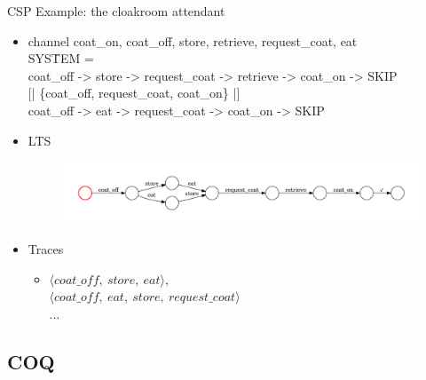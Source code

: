 \documentclass[t]{beamer}
\begin{document}
\begin{frame}{CSP}
	Example: the cloakroom attendant
	\begin{itemize}
		\item \CSPM{}
		\ttfamily
		\scriptsize
		\begin{tabbing}
			channel coat\_on, coat\_off, store, retrieve, request\_coat, eat\\
			SYS\=TEM =\\
			\>	coat\_off -> store -> request\_coat -> retrieve -> coat\_on -> SKIP\\
			\>	{[| \{coat\_off, request\_coat, coat\_on\} |]}\\
			\>	coat\_off -> eat -> request\_coat -> coat\_on -> SKIP
		\end{tabbing}
		\normalfont
		\normalsize

		\item LTS
		\begin{figure}
			\includegraphics[scale=0.3]{figures/LTS.pdf}
		\end{figure}

		\item Traces
		\begin{itemize}
			\item $ \langle \mathit{coat\_off,\ store,\ eat} \rangle, $ \\
			$ \langle \mathit{coat\_off,\ eat,\ store,\ request\_coat} \rangle $\\
			$\ldots$
		\end{itemize}
	\end{itemize}
\end{frame}

\subsection{COQ}
\end{document}
